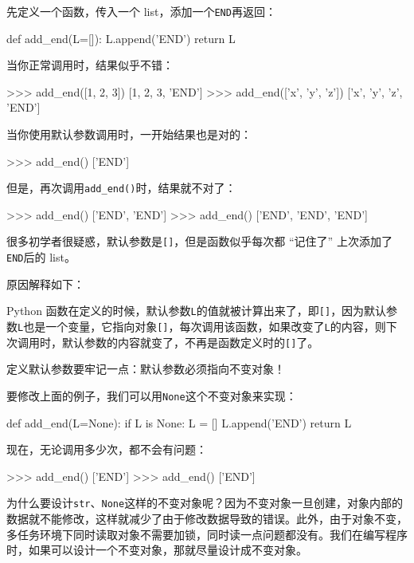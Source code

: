 先定义一个函数，传入一个 list，添加一个\texttt{END}再返回：

\begin{pythoncode}
def add_end(L=[]):
    L.append('END')
    return L
\end{pythoncode}

当你正常调用时，结果似乎不错：

\begin{pythoncode}
>>> add_end([1, 2, 3])
[1, 2, 3, 'END']
>>> add_end(['x', 'y', 'z'])
['x', 'y', 'z', 'END']
\end{pythoncode}

当你使用默认参数调用时，一开始结果也是对的：

\begin{pythoncode}
>>> add_end()
['END']
\end{pythoncode}

但是，再次调用\texttt{add\_end()}时，结果就不对了：

\begin{pythoncode}
>>> add_end()
['END', 'END']
>>> add_end()
['END', 'END', 'END']
\end{pythoncode}

很多初学者很疑惑，默认参数是\texttt{{[}{]}}，但是函数似乎每次都
``记住了''
上次添加了\texttt{\textquotesingle{}END\textquotesingle{}}后的 list。

原因解释如下：

Python
函数在定义的时候，默认参数\texttt{L}的值就被计算出来了，即\texttt{{[}{]}}，因为默认参数\texttt{L}也是一个变量，它指向对象\texttt{{[}{]}}，每次调用该函数，如果改变了\texttt{L}的内容，则下次调用时，默认参数的内容就变了，不再是函数定义时的\texttt{{[}{]}}了。

定义默认参数要牢记一点：默认参数必须指向不变对象！

要修改上面的例子，我们可以用\texttt{None}这个不变对象来实现：

\begin{pythoncode}
def add_end(L=None):
    if L is None:
        L = []
    L.append('END')
    return L
\end{pythoncode}

现在，无论调用多少次，都不会有问题：

\begin{pythoncode}
>>> add_end()
['END']
>>> add_end()
['END']
\end{pythoncode}

为什么要设计\texttt{str}、\texttt{None}这样的不变对象呢？因为不变对象一旦创建，对象内部的数据就不能修改，这样就减少了由于修改数据导致的错误。此外，由于对象不变，多任务环境下同时读取对象不需要加锁，同时读一点问题都没有。我们在编写程序时，如果可以设计一个不变对象，那就尽量设计成不变对象。

